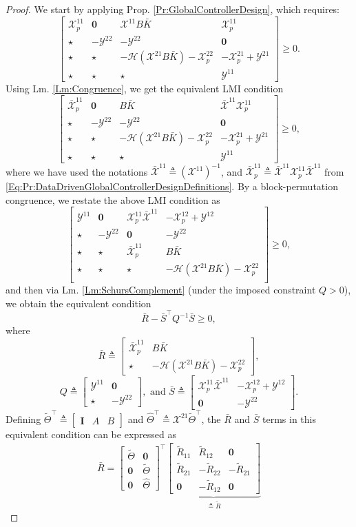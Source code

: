 \documentclass[letterpaper, 10 pt, conference]{ieeeconf}%
\newcommand{\T}{\top}
\newcommand{\I}{\mathbf{I}}
\newcommand{\0}{\mathbf{0}}
\newcommand{\X}{\mathcal{X}}
\newcommand{\Y}{\mathcal{Y}}
\newcommand{\bm}[1]{\begin{bmatrix}#1\end{bmatrix}}
\begin{document}
\begin{proof}
We start by applying Prop. \ref{Pr:GlobalControllerDesign}, which requires:
$$
\bm{
\X_p^{11} & \0 & \X^{11} B \bar{K} & \X_p^{11} \\
\star & -\Y^{22} & -\Y^{22} & \0 \\ 
\star& \star & -\mathcal{H}(\X^{21} B \bar{K})-\X_p^{22} & -\X_p^{21}+\Y^{21} \\
\star & \star & \star &  \Y^{11}
} \geq 0.
$$
Using Lm. \ref{Lm:Congruence}, we get the equivalent LMI condition
$$
\bm{
\bar{\X}_p^{11} & \0 & B \bar{K} & \bar{\X}^{11}\X_p^{11} \\
\star & -\Y^{22} & -\Y^{22} & \0 \\ 
\star& \star & -\mathcal{H}(\X^{21} B \bar{K}) - \X_p^{22} & - \X_p^{21} + \Y^{21} \\
\star & \star & \star &  \Y^{11}
} \geq 0,
$$
where we have used the notations 
$\bar{\X}^{11} \triangleq (\X^{11})^{-1}$, and 
$\bar{\X}_p^{11} \triangleq \bar{\X}^{11} \X_p^{11} \bar{\X}^{11}$ from \eqref{Eq:Pr:DataDrivenGlobalControllerDesignDefinitions}. 
By a block-permutation congruence, we restate the above LMI condition as
$$
\bm{
\Y^{11} & \0 & \X_p^{11}\bar{\X}^{11} & - \X_p^{12} + \Y^{12} \\
\star & -\Y^{22} & \0 & -\Y^{22} \\ 
\star & \star & \bar{\X}_p^{11} & B \bar{K} \\
\star & \star & \star & -\mathcal{H}(\X^{21} B \bar{K}) - \X_p^{22} \\
} \geq 0,
$$
and then via Lm. \ref{Lm:SchursComplement} (under the imposed constraint $Q>0$), we obtain the equivalent condition 
$$
\bar{R} - 
\bar{S}^\T Q^{-1} \bar{S} \geq 0,
$$
where 
$$
\bar{R} \triangleq \bm{
\bar{\X}_p^{11} & B \bar{K} \\
\star & -\mathcal{H}(\X^{21} B \bar{K}) - \X_p^{22}}, 
$$
$$
Q \triangleq \bm{\Y^{11} & \0 \\ \star & -\Y^{22}}, \mbox{ and }
\bar{S} \triangleq \bm{\X_p^{11}\bar{\X}^{11} & -\X_p^{12}+\Y^{12} \\ \0 & -\Y^{22}}.
$$
Defining $\tilde{\Theta}^\T \triangleq \bm{\I & A & B}$ and $\hat{\Theta}^\T \triangleq \X^{21} \tilde{\Theta}^\T$, the $\bar{R}$ and $\bar{S}$ terms in this equivalent condition can be expressed as  
\begin{gather*}
\bar{R} = 
\bm{\tilde{\Theta} & \0 \\ \0 & \tilde{\Theta} \\ \0 & \hat{\Theta}}^\T 
\underbrace{\bm{\tilde{R}_{11} & \tilde{R}_{12} & \0 \\ \tilde{R}_{21} & -\tilde{R}_{22} & -\tilde{R}_{21} \\ \0 & -\tilde{R}_{12} & \0 }}_{\triangleq \tilde{R}} 

\end{gather*}
\end{proof}
\end{document}
